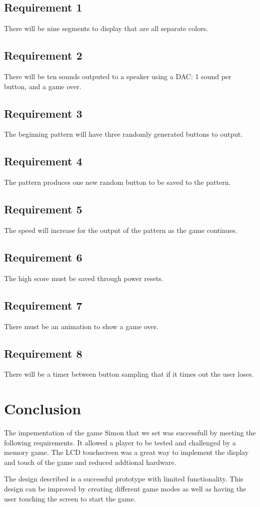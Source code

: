 \documentclass[draft]{article}
\begin{document}
\subsection{Requirement 1}
There will be nine segments to display that are all separate colors.
\subsection{Requirement 2}
There will be ten sounds outputed to a speaker using a DAC: 1 sound per button, and a game over.
\subsection{Requirement 3}
The beginning pattern will have three randomly generated buttons to output.
\subsection{Requirement 4}
The pattern produces one new random button to be saved to the pattern.
\subsection{Requirement 5}
The speed will increase for the output of the pattern as the game continues.
\subsection{Requirement 6}
The high score must be saved through power resets.
\subsection{Requirement 7}
There must be an animation to show a game over.
\subsection{Requirement 8}
There will be a timer between button sampling that if it times out the user loses.

\section{Conclusion}
The impementation of the game Simon that we set was successfull by meeting the following requirements.  It allowed a player to be tested and challenged by a memory game.  The LCD touchscreen was a great way to implement the display and touch of the game and reduced addtional hardware.  
\par\noindent
The	design	described	is	a	successful	prototype	with	limited	functionality.	This	design	can	
be	improved	by creating different game modes as well as having the user touching the screen to start the game.	
\end{document}
